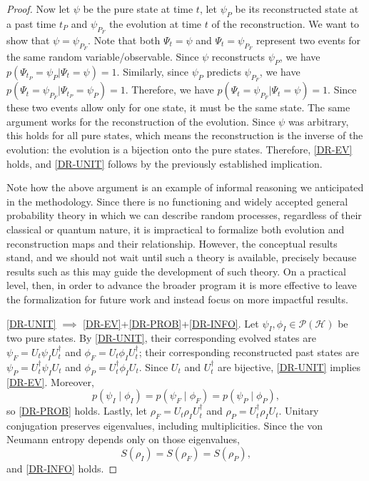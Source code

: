 \documentclass[entropy,article,submit,moreauthors]{Definitions/mdpi}
\begin{document}
\begin{proof}
	Now let $\psi$ be the pure state at time $t$, let $\psi_P$ be its reconstructed state at a past time $t_{P}$ and $\psi_{P_F}$ the evolution at time $t$ of the reconstruction. We want to show that $\psi = \psi_{P_F}$. Note that both $\Psi_t = \psi$ and $\Psi_t = \psi_{P_F}$ represent two events for the same random variable/observable. Since $\psi$ reconstructs $\psi_P$, we have $p(\Psi_{t_P} = \psi_P|\Psi_t = \psi)=1$. Similarly, since $\psi_P$ predicts $\psi_{P_F}$, we have $p(\Psi_t = \psi_{P_F}|\Psi_{t_P} = \psi_P)=1$. Therefore, we have $p(\Psi_t = \psi_{P_F}|\Psi_t = \psi)=1$. Since these two events allow only for one state, it must be the same state. The same argument works for the reconstruction of the evolution. Since $\psi$ was arbitrary, this holds for all pure states, which means the reconstruction is the inverse of the evolution: the evolution is a bijection onto the pure states. Therefore, \ref{DR-EV} holds, and \ref{DR-UNIT} follows by the previously established implication.
		
	Note how the above argument is an example of informal reasoning we anticipated in the methodology. Since there is no functioning and widely accepted general probability theory in which we can describe random processes, regardless of their classical or quantum nature, it is impractical to formalize both evolution and reconstruction maps and their relationship. However, the conceptual results stand, and we should not wait until such a theory is available, precisely because results such as this may guide the development of such theory. On a practical level, then, in order to advance the broader program it is more effective to leave the formalization for future work and instead focus on more impactful results.
	
	\ref{DR-UNIT} $\implies$ \ref{DR-EV}+\ref{DR-PROB}+\ref{DR-INFO}. Let $\psi_I, \phi_I \in \mathcal{P}(\mathcal{H})$ be two pure states. By \ref{DR-UNIT}, their corresponding evolved states are $\psi_F=U_t \psi_I U_t^{\dagger}$ and $\phi_F=U_t\phi_I U_t^{\dagger}$; their corresponding reconstructed past states are $\psi_P = U_t^\dagger\psi_I U_t$ and $\phi_P = U_t^\dagger\phi_I U_t$. Since $U_t$ and $U_t^\dagger$ are bijective, \ref{DR-UNIT} implies \ref{DR-EV}. Moreover,
	\begin{equation}
		p(\psi_I\mid\phi_I)=p(\psi_F\mid\phi_F)=p(\psi_P\mid\phi_P),
	\end{equation}
	so \ref{DR-PROB} holds. Lastly, let $\rho_F=U_t\rho_IU_t^\dagger$ and $\rho_P=U_t^\dagger\rho_I U_t$. Unitary conjugation preserves eigenvalues, including multiplicities. Since the von Neumann entropy depends only on those eigenvalues,
	\begin{equation}
		S(\rho_I)=S(\rho_F)=S(\rho_P),
	\end{equation}
	and \ref{DR-INFO} holds.
	

\end{proof}
\end{document}
